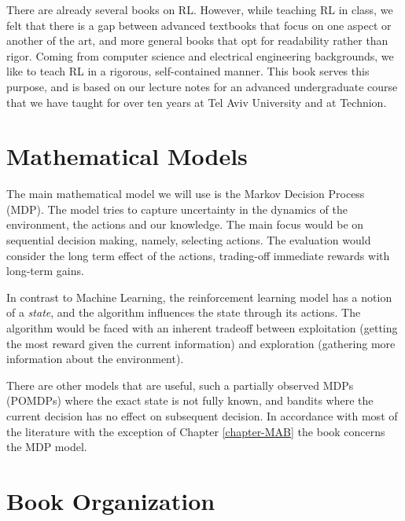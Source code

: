 There are already several books on RL. However, while teaching RL in class, we felt that there is a gap between advanced textbooks that focus on one aspect or another of the art, and more general books that opt for readability rather than rigor. Coming from computer science and electrical engineering backgrounds, we like to teach RL in a rigorous, self-contained manner. This book serves this purpose, and is based on our lecture notes for an advanced undergraduate course that we have taught for over ten years at Tel Aviv University and at Technion.


\section{Mathematical Models}
%
The main mathematical model we will use is the Markov Decision Process
(MDP). The model tries to capture uncertainty in the dynamics of the
environment, the actions and our knowledge. The main focus would be
on sequential decision making, namely, selecting actions. The evaluation would
consider the long term effect of the actions, trading-off immediate
rewards with long-term gains.

In contrast to Machine Learning, the reinforcement learning model
 has a notion of a {\em state}, and the algorithm influences the state
through its actions.
The algorithm would be faced with an inherent tradeoff between
exploitation (getting the most reward given the current information)
and exploration (gathering more information about the environment).


There are other models that are useful, such a partially observed MDPs (POMDPs) where the exact state is not fully known, and bandits where the current decision has no effect on subsequent decision. In accordance with most of the literature with the exception of Chapter \ref{chapter-MAB} the book concerns the MDP model.


\section{Book Organization}

